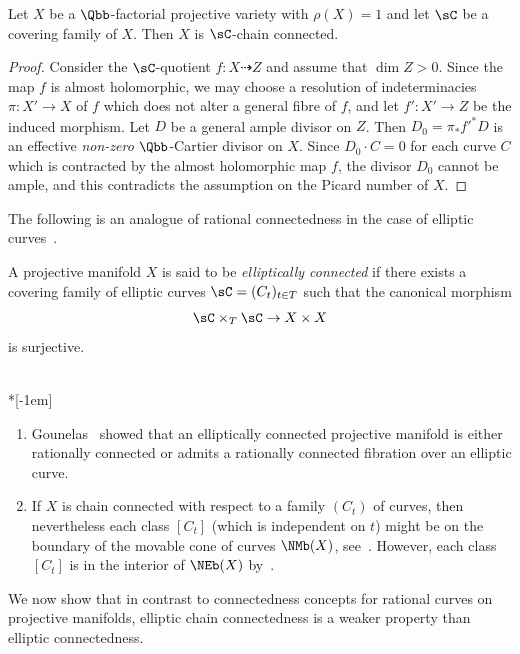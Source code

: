 \begin{lemm}\label{lem:triv}
Let $X$ be a $\Qbb$-factorial projective variety with $\rho(X) = 1$ and let $\sC$ be a covering family of $X$. Then $X$ is $\sC$-chain connected.
\end{lemm}

\begin{proof}
Consider the $\sC$-quotient $f\colon X \dasharrow Z$ and assume that $\dim Z > 0.$ Since the map $f$ is almost holomorphic, we may choose a resolution of indeterminacies $\pi\colon X' \to X$ of $f$ which does not alter a general fibre of $f$, and let $f'\colon X' \to Z$ be the induced morphism. Let $D$ be a general ample divisor on $Z$. Then $D_0 = \pi_*f'^*D$ is an effective \emph{non-zero} $\Qbb$-Cartier divisor on $X$. Since $D_0 \cdot C = 0 $ for each curve $C$ which is contracted by the almost holomorphic map $f$, the divisor $D_0$ cannot be ample, and this contradicts the assumption on the Picard number of $X$.
\end{proof}

The following is an analogue of rational connectedness in the case of elliptic curves~\cite[Definition~3.3]{Gou16}.

\begin{defi}\label{def:main4.5}
A projective manifold $X$ is said to be \emph{elliptically connected} if there exists a covering family of elliptic curves $\sC = (C_t)_{t \in T}$ such that the canonical morphism
\[
\sC \times_T \sC \to X \times X
\]
is surjective.
\end{defi}

\begin{rema}\label{rem2}\ \\*[-1em]
\begin{enumerate}
\item \label{list-4.6.1}Gounelas~\cite[Theorem~6.2]{Gou16} showed that an elliptically connected projective manifold is either rationally connected or admits a rationally connected fibration over an elliptic curve.
\item \label{list-4.6.2}If $X$ is chain connected with respect to a family $(C_t)$ of curves, then nevertheless each class $[C_t]$ (which is independent on $t$) might be on the boundary of the movable cone of curves $\NMb(X)$, see~\cite[Example~8.8]{BDPP}. However, each class $[C_t]$ is in the interior of $\NEb(X)$ by~\cite[Theorem~2.6]{BCE+}.
\end{enumerate}
\end{rema}

We now show that in contrast to connectedness concepts for rational curves on projective manifolds, elliptic chain connectedness is a weaker property than elliptic connectedness.

